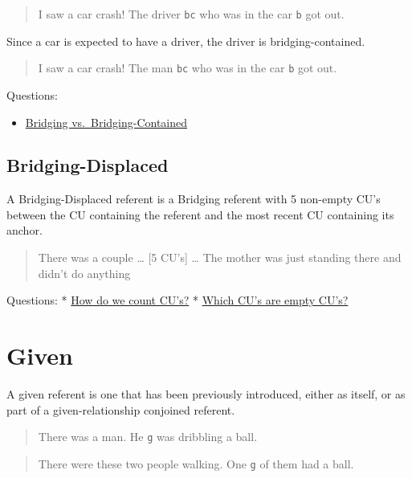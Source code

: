 \documentclass[
]{book}
\providecommand{\tightlist}{%
  \setlength{\itemsep}{0pt}\setlength{\parskip}{0pt}}
\begin{document}
\begin{quote}
I saw a car crash! The driver \texttt{bc} who was in the car \texttt{b} got out.
\end{quote}

Since a car is expected to have a driver, the driver is bridging-contained.

\begin{quote}
I saw a car crash! The man \texttt{bc} who was in the car \texttt{b} got out.
\end{quote}

Questions:

\begin{itemize}
\tightlist
\item
  \protect\hyperlink{bridging-vs.-bridging-contained}{Bridging vs.~Bridging-Contained}
\end{itemize}

\hypertarget{bridging-displaced}{%
\subsection{Bridging-Displaced}\label{bridging-displaced}}

A Bridging-Displaced referent is a Bridging referent with 5 non-empty CU's between the CU containing the referent and the most recent CU containing its anchor.

\begin{quote}
There was a couple \ldots{}
{[}5 CU's{]} \ldots{}
The mother was just standing there and didn't do anything
\end{quote}

Questions:
* \protect\hyperlink{counting-cus}{How do we count CU's?}
* \protect\hyperlink{empty-cus}{Which CU's are empty CU's?}

\hypertarget{given}{%
\section{Given}\label{given}}

A given referent is one that has been previously introduced, either as itself, or as part of a given-relationship conjoined referent.

\begin{quote}
There was a man.
He \texttt{g} was dribbling a ball.
\end{quote}

\begin{quote}
There were these two people walking.
One \texttt{g} of them had a ball.
\end{quote}
\end{document}
